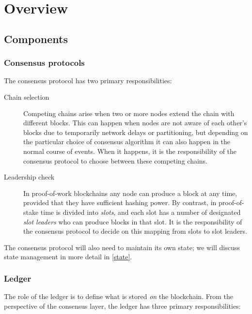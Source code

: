 \chapter{Overview}

\section{Components}

\subsection{Consensus protocols}
\label{overview:consensus}

The consensus protocol has two primary responsibilities:
\label{consensus-responsibilities}

\begin{description}
\item[Chain selection] Competing chains arise when two or more nodes extend the
chain with different blocks. This can happen when nodes are not aware of each
other's blocks due to temporarily network delays or partitioning, but depending
on the particular choice of consensus algorithm it can also happen in the normal
course of events. When it happens, it is the responsibility of the consensus
protocol to choose between these competing chains.

\item[Leadership check] In proof-of-work blockchains any node can produce a
block at any time, provided that they have sufficient hashing power. By
contrast, in proof-of-stake time is divided into \emph{slots}, and each slot has
a number of designated \emph{slot leaders} who can produce blocks in that slot.
It is the responsibility of the consensus protocol to decide on this mapping
from slots to slot leaders.
\end{description}

The consensus protocol will also need to maintain its own state; we will discuss
state management in more detail in \cref{state}.

\subsection{Ledger}
\label{overview:ledger}

The role of the ledger is to define what is stored \emph{on} the blockchain.
From the perspective of the consensus layer, the ledger has three primary
responsibilities:

